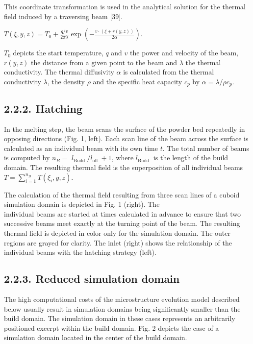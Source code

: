 \documentclass[10pt]{article}
\begin{document}
This coordinate transformation is used in the analytical solution for the thermal field induced by a traversing beam [39].

$T(\xi, y, z)=T_{0}+\frac{q / v}{2 \pi \lambda} \exp \left(-\frac{v \cdot(\xi+r(y, z))}{2 \alpha}\right)$.

$T_{0}$ depicts the start temperature, $q$ and $v$ the power and velocity of the beam, $r(y, z)$ the distance from a given point to the beam and $\lambda$ the thermal conductivity. The thermal diffusivity $\alpha$ is calculated from the thermal conductivity $\lambda$, the density $\rho$ and the specific heat capacity $c_{p}$ by $\alpha=\lambda / \rho c_{p}$.

\subsection*{2.2.2. Hatching}
In the melting step, the beam scans the surface of the powder bed repeatedly in opposing directions (Fig. 1, left). Each scan line of the beam across the surface is calculated as an individual beam with its own time $t$. The total number of beams is computed by $n_{B}=$ $l_{\text {Build }} / l_{\text {off }}+1$, where $l_{\text {Build }}$ is the length of the build domain. The resulting thermal field is the superposition of all individual beams $T=\sum_{i=1}^{n_{B}} T\left(\xi_{i}, y, z\right)$.

The calculation of the thermal field resulting from three scan lines of a cuboid simulation domain is depicted in Fig. 1 (right). The\\
individual beams are started at times calculated in advance to ensure that two successive beams meet exactly at the turning point of the beam. The resulting thermal field is depicted in color only for the simulation domain. The outer regions are grayed for clarity. The inlet (right) shows the relationship of the individual beams with the hatching strategy (left).

\subsection*{2.2.3. Reduced simulation domain}
The high computational costs of the microstructure evolution model described below usually result in simulation domains being significantly smaller than the build domain. The simulation domain in these cases represents an arbitrarily positioned excerpt within the build domain. Fig. 2 depicts the case of a simulation domain located in the center of the build domain.
\end{document}
